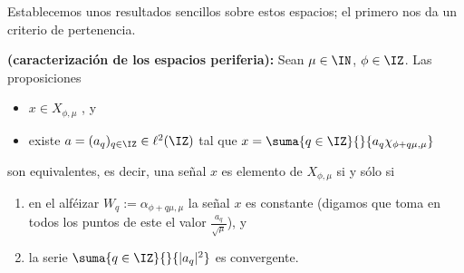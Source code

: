 \noindent Establecemos unos resultados sencillos sobre estos espacios; 
el primero nos da un criterio de pertenencia.

\begin{teo}
\label{teo:caracterizacion espacios periferia}
\textbf{(caracterización de los espacios periferia):}
Sean $\mu \in \IN$, $\phi \in \IZ$. Las proposiciones
\begin{itemize}
\item $x \in X_{\phi, \mu}$ , y
\item existe $a=(a_{q})_{q \in \IZ} \in \ell ^{2}(\IZ)$
tal que 
$x=\suma{q\in \IZ}{}{a_{q}\chi_{\phi+q \mu ,\mu}}$
\end{itemize}
son equivalentes, es decir,
una señal $x$ es elemento de $X_{\phi, \mu}$ si y sólo si

\begin{enumerate}
\item en el alféizar $W_{q}:=\alpha_{\phi + q \mu, \mu}$ 
la señal $x$ es constante
(digamos que toma en todos los puntos de este el valor
$\frac{a_{q}}{\sqrt{\mu}}$), y

\item la serie $\suma{q \in \IZ}{}{|a_{q}|^{2}}$ es convergente.
\end{enumerate}

\end{teo}
